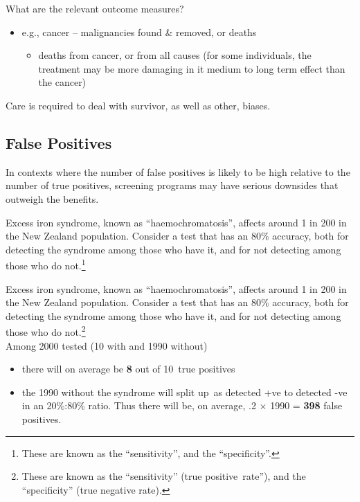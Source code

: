 \documentclass[
  10ptls,
  b5paper]{book}
\providecommand{\tightlist}{%
  \setlength{\itemsep}{0pt}\setlength{\parskip}{0pt}}
\begin{document}
What are the relevant outcome measures?

\begin{itemize}
\tightlist
\item
  e.g., cancer -- malignancies found \& removed, or deaths

  \begin{itemize}
  \tightlist
  \item
    deaths from cancer, or from all causes (for some individuals,
    the treatment may be more damaging in it medium to long term
    effect than the cancer)
  \end{itemize}
\end{itemize}

Care is required to deal with survivor, as well as other, biases.

\hypertarget{false-positives}{%
\subsection{False Positives}\label{false-positives}}

In contexts where the number of false positives is likely to be high
relative to the number of true positives, screening programs may have
serious downsides that outweigh the benefits.

Excess iron syndrome, known as ``haemochromatosis'', affects around 1 in
200 in the New Zealand population. Consider a test that has an 80\%
accuracy, both for detecting the syndrome among those who have it, and
for not detecting among those who do not.\footnote{These are known as the ``sensitivity'', and the
  ``specificity''.}

Excess iron syndrome, known as ``haemochromatosis'', affects around 1 in
200 in the New Zealand population. Consider a test that has an 80\%
accuracy, both for detecting the syndrome among those who have it, and
for not detecting among those who do not.\footnote{These are known as the ``sensitivity'' (true
  positive~rate''), and the ``specificity'' (true negative rate).}\\
Among 2000 tested (10 with and 1990 without)

\begin{itemize}
\tightlist
\item
  there will on average be \textbf{8} out of 10~true positives
\item
  the 1990 without the syndrome will split up~as detected +ve to
  detected -ve in an 20\%:80\% ratio. Thus there will be, on average, .2
  \(\times\) 1990 = \textbf{398} false positives.
\end{itemize}
\end{document}
